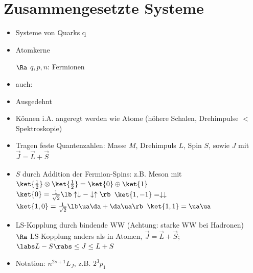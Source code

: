 \section{Zusammengesetzte Systeme}
\begin{itemize}
\item Systeme von Quarks q
\item Atomkerne
\item[$\Ra$] $q,p,n$: Fermionen
\item auch:
\end{itemize}

\begin{itemize}
\item Ausgedehnt
\item Können i.A. angeregt werden wie Atome (höhere Schalen, Drehimpulse $\lt$ Spektroskopie)
\item Tragen feste Quantenzahlen: Masse $M$, Drehimpuls $L$, Spin $S$, sowie $J$ mit $\vec{J} = \vec{L}+\vec{S}$
\end{itemize}

\begin{itemize}
\item $S$ durch Addition der Fermion-Spins: z.B. Meson mit $\ket{\frac{1}{2}} \otimes \ket{\frac{1}{2}} = \ket{0} \oplus \ket{1}$\\
$\ket{0} = \frac{1}{\sqrt{2}}\lb  \uparrow \downarrow - \downarrow \uparrow\rb $ \hfill $\ket{1,-1} = \downarrow\downarrow$ \hfill $\ket{1,0} = \frac{1}{\sqrt{2}}\lb  \ua\da + \da \ua \rb $ \hfill $\ket{1,1} = \ua\ua$
\item LS-Kopplung durch bindende WW (Achtung: starke WW bei Hadronen)\\
$\Ra$ LS-Kopplung anders als in Atomen, $\vec{J} = \vec{L} + \vec{S}$; $\labs L-S \rabs \leq J \leq L+S$
\item Notation: $n^{2s+1}L_J$, z.B. $2^3p_1$
\end{itemize}

